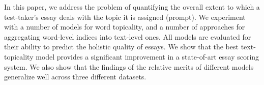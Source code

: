 In this paper, we address the problem of quantifying the overall extent to which a test-taker's essay deals with the topic it is assigned (prompt).  We experiment with a number of models for word topicality, and a number of approaches for aggregating word-level indices into text-level ones. All models are evaluated for their ability to predict the holistic quality of essays. We show that the best text-topicality model provides a significant improvement in a  state-of-art essay scoring system. We also show that the findings of the relative merits of different models  generalize well across three different datasets.
